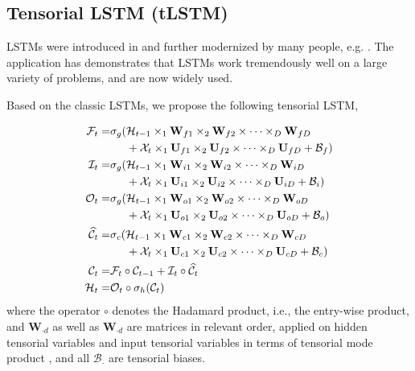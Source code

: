 \documentclass[journal]{IEEEtran}
\newcounter{gaocomm}
\newcommand{\GaoC}[1]{\textcolor{blue-violet}{\stepcounter{gaocomm}{\bf [Junbin's comment \arabic{gaocomm}: #1]}\;}}
\begin{document}
\subsection{Tensorial LSTM (tLSTM)}
LSTMs were introduced in \cite{HochreiterSchmidhuber1997} and further modernized by   many people, e.g. \cite{GersSchmidhuberCummins2000}.  The application has demonstrates that LSTMs work tremendously well on a large variety of problems, and are now widely used.

Based on the classic LSTMs, we propose the following tensorial LSTM,  %



\begin{align}
\mathcal{F}_t =& \sigma_g(\mathcal{H}_{t-1}\times_1 \mathbf W_{f1}\times_2 \mathbf W_{f2}\times \cdots \times_D\mathbf{W}_{fD}  \notag\\
&\phantom{\sigma_g(} + \mathcal{X}_{t}\times_1 \mathbf U_{f1}\times_2 \mathbf U_{f2}\times \cdots \times_D\mathbf{U}_{fD} + \mathcal{B}_f) \label{Eq3}\\
\mathcal{I}_t =& \sigma_g(\mathcal{H}_{t-1}\times_1 \mathbf W_{i1}\times_2 \mathbf W_{i2}\times \cdots \times_D\mathbf{W}_{iD}  \notag\\
&\phantom{\sigma_g(} + \mathcal{X}_{t}\times_1 \mathbf U_{i1}\times_2 \mathbf U_{i2}\times \cdots \times_D\mathbf{U}_{iD} + \mathcal{B}_i) \label{Eq4}\\
\mathcal{O}_t =& \sigma_g(\mathcal{H}_{t-1}\times_1 \mathbf W_{o1}\times_2 \mathbf W_{o2}\times \cdots \times_D\mathbf{W}_{oD}  \notag\\
&\phantom{\sigma_g(} + \mathcal{X}_{t}\times_1 \mathbf U_{o1}\times_2 \mathbf U_{o2}\times \cdots \times_D\mathbf{U}_{oD} + \mathcal{B}_o) \label{Eq5}\\
\widehat{\mathcal{C}}_t =& \sigma_c(\mathcal{H}_{t-1}\times_1 \mathbf W_{c1}\times_2 \mathbf W_{c2}\times \cdots \times_D\mathbf{W}_{cD}  \notag\\
&\phantom{\sigma_g(} + \mathcal{X}_{t}\times_1 \mathbf U_{c1}\times_2 \mathbf U_{c2}\times \cdots \times_D\mathbf{U}_{cD} + \mathcal{B}_c) \label{Eq6}\\
\mathcal{C}_t =& \mathcal{F}_t\circ \mathcal{C}_{t-1} + \mathcal{I}_t \circ \widehat{\mathcal{C}}_t \label{Eq7}\\
\mathcal{H}_t =& \mathcal{O}_t \circ \sigma_h(\mathcal{C}_t) \label{Eq8}
\end{align}
where the operator $\circ$ denotes the Hadamard product, i.e., the entry-wise product, and $\mathbf W_{\cdot d}$ as well as $\mathbf W_{\cdot d}$ are matrices in relevant order, applied on hidden tensorial variables and input tensorial variables in terms of tensorial mode product \cite{KoldaBader2009}, and all $\mathcal{B}_{\cdot}$ are tensorial biases.
\end{document}
